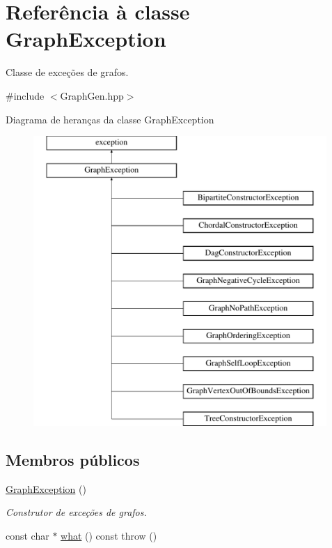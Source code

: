 \hypertarget{classGraphException}{}\section{Referência à classe Graph\+Exception}
\label{classGraphException}


Classe de exceções de grafos.  




{\ttfamily \#include $<$Graph\+Gen.\+hpp$>$}

Diagrama de heranças da classe Graph\+Exception\begin{figure}[H]
\begin{center}
\leavevmode
\includegraphics[height=11.000000cm]{classGraphException}
\end{center}
\end{figure}
\subsection*{Membros públicos}
\begin{DoxyCompactItemize}
\item 
\mbox{\label{classGraphException_aff738f8b56022becfafb28c8cf4efce7}} 
\hyperlink{classGraphException_aff738f8b56022becfafb28c8cf4efce7}{Graph\+Exception} ()
\begin{DoxyCompactList}\small\item\em Construtor de exceções de grafos. \end{DoxyCompactList}\item 
const char $\ast$ \hyperlink{classGraphException_ad4368b8af89252086b225cedcfc38639}{what} () const  throw ()
\end{DoxyCompactItemize}


